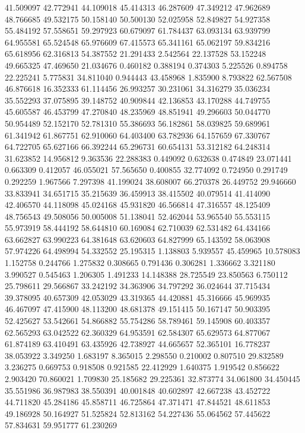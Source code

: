 41.509097
42.772941
44.109018
45.414313
46.287609
47.349212
47.962689
48.766685
49.532175
50.158140
50.500130
52.025958
52.849827
54.927358
55.484192
57.558651
59.297923
60.679097
61.784437
63.093134
63.939799
64.955581
65.524548
65.976609
67.415573
65.341161
65.062197
59.834216
65.618956
62.316813
54.387552
21.291433
2.542564
22.137528
53.152248
49.665325
47.469650
21.034676
0.460182
0.388194
0.374303
5.225526
0.894758
22.225241
5.775831
34.811040
0.944443
43.458968
1.835900
8.793822
62.567508
46.876618
16.352333
61.114456
26.993257
30.231061
34.316279
35.036234
35.552293
37.075895
39.148752
40.909844
42.136853
43.170288
44.749755
45.605587
46.453799
47.270840
48.235969
48.851941
49.296603
50.044770
50.954489
52.152170
52.781310
55.386693
56.182861
58.039825
59.689961
61.341942
61.867751
62.910060
64.403400
63.782936
64.157659
67.330767
64.722705
65.627166
66.392244
65.296731
60.654131
53.312182
64.248314
31.623852
14.956812
9.363536
22.288383
0.449092
0.632638
0.474849
23.071441
0.663309
0.412057
46.055021
57.565650
0.400855
32.774092
0.724950
0.291749
0.292259
1.967566
7.297398
41.199024
38.608007
66.270378
26.449752
29.946660
33.833941
34.651715
35.215639
36.459913
38.415502
40.079514
41.414090
42.406570
44.118098
45.024168
45.931820
46.566814
47.316557
48.125409
48.756543
49.508056
50.005008
51.138041
52.462044
53.965540
55.553115
55.973919
58.444192
58.644810
60.169084
62.710039
62.531482
64.434166
63.662827
63.990223
64.381648
63.620603
64.827999
65.143592
58.063908
57.974226
64.498994
54.332552
25.195315
1.138803
5.939557
45.459965
10.578083
1.152758
0.244766
1.275832
0.308665
0.791436
0.306281
1.336662
3.321180
3.990527
0.545463
1.206305
1.491233
14.148388
28.725549
23.850563
6.750112
25.798611
29.566867
33.242192
34.363906
34.797292
36.024644
37.715434
39.378095
40.657309
42.053029
43.319365
44.420881
45.316666
45.969935
46.467097
47.415900
48.113200
48.681378
49.151415
50.167147
50.903395
52.425627
53.542661
54.866882
55.754286
58.789461
59.145908
60.403357
62.565293
63.042522
62.360329
64.953591
62.584307
65.629573
64.877067
61.874189
63.410491
63.435926
42.738927
44.665657
52.365101
16.778237
38.053922
3.349250
1.683197
8.365015
2.298550
0.210002
0.807510
29.832589
3.236275
0.669753
0.918508
0.921585
22.412929
1.640375
1.919542
0.856622
2.903420
70.860021
1.709830
25.185682
29.225361
32.873774
34.061800
34.450445
35.551986
36.987983
38.550391
40.001848
40.602897
42.667238
43.452722
44.711820
45.284186
45.858711
46.725864
47.371471
47.844521
48.611853
49.186928
50.164927
51.525824
52.813162
54.227436
55.064562
57.445622
57.834631
59.951777
61.230269
